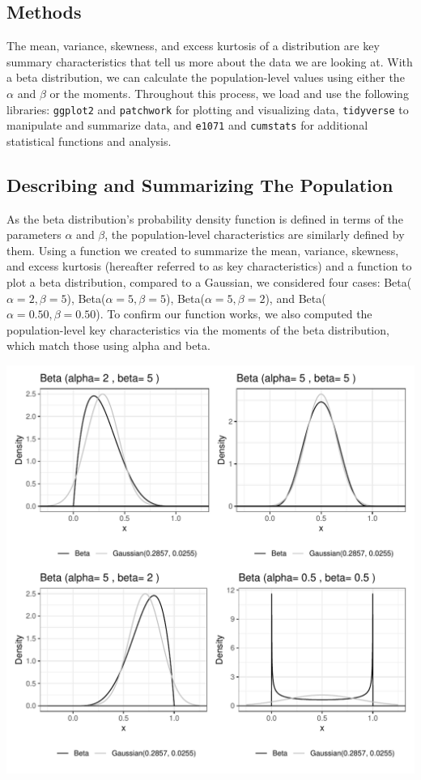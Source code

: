 \documentclass{article}\usepackage[]{graphicx}\usepackage[]{xcolor}
\makeatletter
\def\maxwidth{ %
  \ifdim\Gin@nat@width>\linewidth
    \linewidth
  \else
    \Gin@nat@width
  \fi
}
\newenvironment{knitrout}{}{} %
\makeatother
\begin{document}
\begin{multicols}{2}
\section{Methods}
The mean, variance, skewness, and excess kurtosis of a distribution are key summary characteristics that tell us more about the data we are looking at. With a beta distribution, we can calculate the population-level values using either the $\alpha$ and $\beta$ or the moments. Throughout this process, we load and use the following libraries: \texttt{ggplot2} \citep{ggplot2} and \texttt{patchwork} \citep{patchwork} for plotting and visualizing data, \texttt{tidyverse} \citep{tidyverse} to manipulate and summarize data, and \texttt{e1071} \citep{e1071} and \texttt{cumstats} \citep{cumstats} for additional statistical functions and analysis. 

\subsection{Describing and Summarizing The Population}
As the beta distribution's probability density function is defined in terms of the parameters $\alpha$ and $\beta$, the population-level characteristics are similarly defined by them. Using a function we created to summarize the mean, variance, skewness, and excess kurtosis (hereafter referred to as key characteristics) and a function to plot a beta distribution, compared to a Gaussian, we considered four cases: 
Beta($\alpha = 2, \beta = 5$), Beta($\alpha = 5, \beta = 5$), Beta($\alpha = 5, \beta = 2$), and Beta($\alpha = 0.50, \beta = 0.50$). 
To confirm our function works, we also computed the population-level key characteristics via the moments of the beta distribution, which match those using alpha and beta.

\begin{knitrout}\scriptsize
{}\color{fgcolor}
\includegraphics[width=\maxwidth]{figure/unnamed-chunk-1-1} 
\end{knitrout}


\end{multicols}
\end{document}
